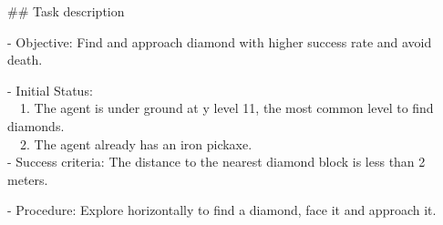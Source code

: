 

\#\# Task description

- Objective: Find and approach diamond with higher success rate and avoid death.

- Initial Status: 
\\
\hbox{\ \ }1. The agent is under ground at y level 11, the most common level to find diamonds.\\
\hbox{\ \ }2. The agent already has an iron pickaxe.\\
- Success criteria: The distance to the nearest diamond block is less than 2 meters. 

- Procedure: Explore horizontally to find a diamond, face it and approach it.


